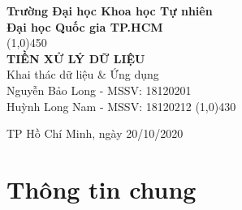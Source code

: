 \documentclass[a4paper, 12pt]{article}
\begin{document}
\begin{titlepage}
    \begin{center}
        \vspace*{1cm}
        \Large\textbf{Trường Đại học Khoa học Tự nhiên\\Đại học Quốc gia TP.HCM}\\

        \vfill
        \line(1,0){450}\\[4mm]
        \LARGE\textbf{\MakeUppercase{Tiền xử lý dữ liệu}}\\[3mm]
        \Large{Khai thác dữ liệu \& Ứng dụng}\\[3mm]
        \Large{Nguyễn Bảo Long - MSSV: 18120201}\\
        \Large{Huỳnh Long Nam - MSSV: 18120212}
        \line(1,0){430}\\
        \vfill

        \vfill
        TP Hồ Chí Minh, ngày 20/10/2020
    \end{center}
\end{titlepage}

\tableofcontents
\thispagestyle{empty}
\clearpage

\section{Thông tin chung}
\end{document}
